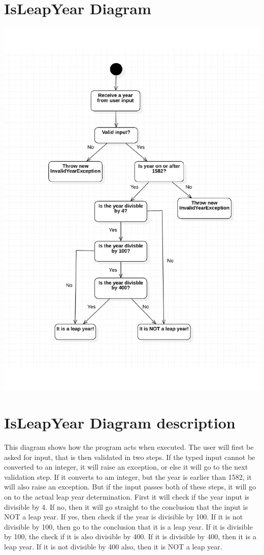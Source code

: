 \documentclass{article}
\begin{document}
\section{IsLeapYear Diagram}
\begin{center}
    \includegraphics[width=\textwidth]{Diagrams/LeapYearUML.pdf}
    \label{FYMap}
\end{center}

\newpage

\section{IsLeapYear Diagram description}

This diagram shows how the program acts when executed. 
The user will first be asked for input, that is then validated in two steps. If the typed input cannot be converted to an integer, it will raise an exception, or else it will go to the next validation step. If it converts to am integer, but the year is earlier than 1582, it will also raise an exception. But if the input passes both of these steps, it will go on to the actual leap year determination.
First it will check if the year input is divisible by 4. If no, then it will go straight to the conclusion that the input is NOT a leap year.
If yes, then check if the year is divisible by 100. If it is not divisible by 100, then go to the conclusion that it is a leap year. If it is divisible by 100, the check if it is also divisible by 400. If it is divisible by 400, then it is a leap year. If it is not divisible by 400 also, then it is NOT a leap year.
\end{document}

